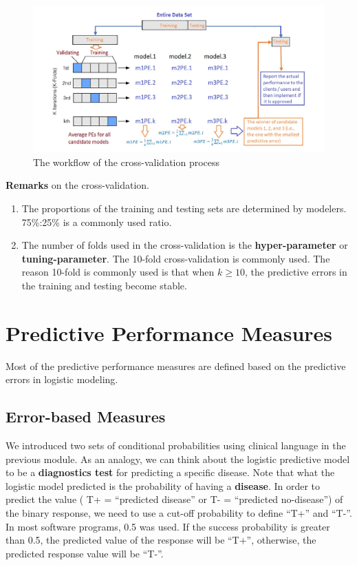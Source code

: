 \documentclass[
]{book}
\begin{document}
\begin{figure}

{\centering \includegraphics[width=0.9\linewidth]{img08/w08-CV-process} 

}

\caption{The workflow of the cross-validation process}\label{fig:unnamed-chunk-141}
\end{figure}

\textbf{Remarks} on the cross-validation.

\begin{enumerate}
\def\labelenumi{\arabic{enumi}.}
\item
  The proportions of the training and testing sets are determined by modelers. 75\%:25\% is a commonly used ratio.
\item
  The number of folds used in the cross-validation is the \textbf{hyper-parameter} or \textbf{tuning-parameter}. The 10-fold cross-validation is commonly used. The reason 10-fold is commonly used is that when \(k \ge 10\), the predictive errors in the training and testing become stable.
\end{enumerate}

\hypertarget{predictive-performance-measures}{%
\section{Predictive Performance Measures}\label{predictive-performance-measures}}

Most of the predictive performance measures are defined based on the predictive errors in logistic modeling.

\hypertarget{error-based-measures}{%
\subsection{Error-based Measures}\label{error-based-measures}}

We introduced two sets of conditional probabilities using clinical language in the previous module. As an analogy, we can think about the logistic predictive model to be a \textbf{diagnostics test} for predicting a specific disease. Note that what the logistic model predicted is the probability of having a \textbf{disease}. In order to predict the value ( T+ = ``predicted disease'' or T- = ``predicted no-disease'') of the binary response, we need to use a cut-off probability to define ``T+'' and ``T-''. In most software programs, 0.5 was used. If the success probability is greater than 0.5, the predicted value of the response will be ``T+'', otherwise, the predicted response value will be ``T-''.
\end{document}
